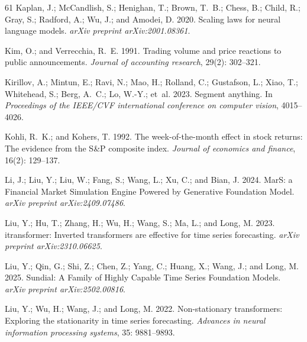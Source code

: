 \documentclass[letterpaper]{article} %
\begin{document}
\begin{thebibliography}{61}
Kaplan, J.; McCandlish, S.; Henighan, T.; Brown, T.~B.; Chess, B.; Child, R.;
  Gray, S.; Radford, A.; Wu, J.; and Amodei, D. 2020.
\newblock Scaling laws for neural language models.
\newblock \emph{arXiv preprint arXiv:2001.08361}.

Kim, O.; and Verrecchia, R.~E. 1991.
\newblock Trading volume and price reactions to public announcements.
\newblock \emph{Journal of accounting research}, 29(2): 302--321.

Kirillov, A.; Mintun, E.; Ravi, N.; Mao, H.; Rolland, C.; Gustafson, L.; Xiao,
  T.; Whitehead, S.; Berg, A.~C.; Lo, W.-Y.; et~al. 2023.
\newblock Segment anything.
\newblock In \emph{Proceedings of the IEEE/CVF international conference on
  computer vision}, 4015--4026.

Kohli, R.~K.; and Kohers, T. 1992.
\newblock The week-of-the-month effect in stock returns: The evidence from the
  S\&P composite index.
\newblock \emph{Journal of economics and finance}, 16(2): 129--137.

Li, J.; Liu, Y.; Liu, W.; Fang, S.; Wang, L.; Xu, C.; and Bian, J. 2024.
\newblock MarS: a Financial Market Simulation Engine Powered by Generative
  Foundation Model.
\newblock \emph{arXiv preprint arXiv:2409.07486}.

Liu, Y.; Hu, T.; Zhang, H.; Wu, H.; Wang, S.; Ma, L.; and Long, M. 2023.
\newblock itransformer: Inverted transformers are effective for time series
  forecasting.
\newblock \emph{arXiv preprint arXiv:2310.06625}.

Liu, Y.; Qin, G.; Shi, Z.; Chen, Z.; Yang, C.; Huang, X.; Wang, J.; and Long,
  M. 2025.
\newblock Sundial: A Family of Highly Capable Time Series Foundation Models.
\newblock \emph{arXiv preprint arXiv:2502.00816}.

Liu, Y.; Wu, H.; Wang, J.; and Long, M. 2022.
\newblock Non-stationary transformers: Exploring the stationarity in time
  series forecasting.
\newblock \emph{Advances in neural information processing systems}, 35:
  9881--9893.


\end{thebibliography}
\end{document}
